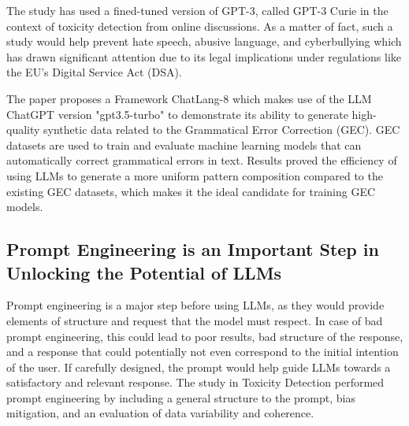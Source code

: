 \vspace{0.5cm}
The study \cite{Kruschwitz2024} has used a fined-tuned version of GPT-3, called GPT-3 Curie in the context of toxicity detection from online discussions. 
As a matter of fact, such a study would help prevent hate speech, abusive language, and cyberbullying which has drawn significant attention due to its legal implications under regulations like the EU's Digital Service Act (DSA). 


\vspace{0.5cm}
The paper \cite{Park2024} proposes a Framework ChatLang-8 which makes use of the LLM ChatGPT version "gpt3.5-turbo" to demonstrate its ability to generate high-quality synthetic data related to the Grammatical Error Correction (GEC). GEC datasets are used to train and evaluate machine learning models that can automatically correct grammatical errors in text. Results proved the efficiency of using LLMs to generate a more uniform pattern composition compared to the existing GEC datasets, which makes it the ideal candidate for training GEC models.





















\subsection{Prompt Engineering is an Important Step in Unlocking the Potential of LLMs}

Prompt engineering is a major step before using LLMs, as they would provide elements of structure and request that the model must respect. In case of bad prompt engineering, this could lead to poor results, bad structure of the response, and a response that could potentially not even correspond to the initial intention of the user. 
If carefully designed, the prompt would help guide LLMs towards a satisfactory and relevant response. The study \cite{Kruschwitz2024} in Toxicity Detection performed prompt engineering by including a general structure to the prompt, bias mitigation, and an evaluation of data variability and coherence. 



